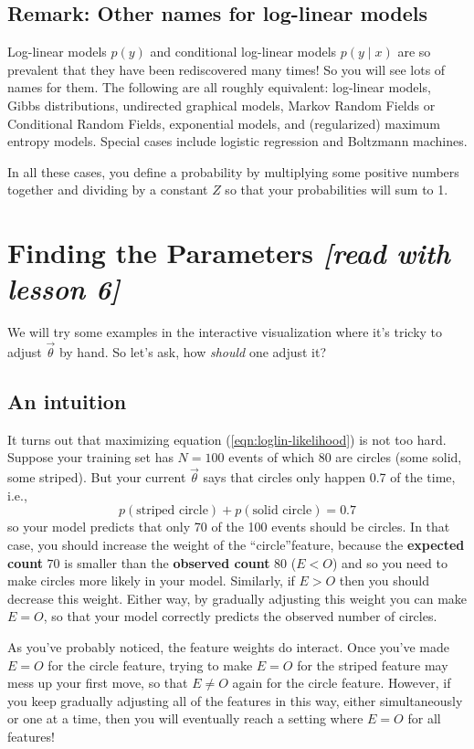 \documentclass[11pt]{article}
\newcommand{\vtheta}{\vec{\theta}}
\begin{document}
\subsection{Remark: Other names for log-linear models}

Log-linear models $p(y)$ and conditional log-linear models
$p(y\mid x)$ are so prevalent that they have been rediscovered many
times!  So you will see lots of names for them.  The following are all
roughly equivalent: log-linear models, Gibbs distributions, undirected
graphical models, Markov Random Fields or Conditional Random Fields,
exponential models, and (regularized) maximum entropy models.
Special cases include logistic regression and Boltzmann machines.

\medskip
In all these cases, you define a probability by multiplying some
positive numbers together and dividing by a constant $Z$ so that your
probabilities will sum to 1.

\section{Finding the Parameters {\em [read with lesson 6]}}

We will try some examples in the interactive visualization where it's
tricky to adjust $\vtheta$ by hand.  So let's ask, how {\em should}
one adjust it?

\subsection{An intuition}

It turns out that maximizing equation (\ref{eqn:loglin-likelihood}) is
not too hard.  Suppose your training set has $N=100$ events of which
80 are circles (some solid, some striped).  But your current $\vtheta$
says that circles only happen 0.7 of the time, i.e.,
$$p(\textrm{striped circle}) + p(\textrm{solid circle}) = 0.7$$
so your model predicts that only 70 of the 100 events should be circles.
%
In that case, you should increase the weight of the ``circle''feature,
because the {\bf expected count} $70$ is smaller than the {\bf
  observed count} $80$ ($E < O$) and so you need to make circles more
likely in your model.  Similarly, if $E > O$ then you should decrease this weight.
Either way, by gradually adjusting this weight you can make $E=O$, so
that your model correctly predicts the observed number of circles.

\medskip
As you've probably noticed, the feature weights do interact.  Once
you've made $E=O$ for the circle feature, trying to make $E=O$ for the
striped feature may mess up your first move, so that $E \neq O$ again
for the circle feature.  However, if you keep gradually adjusting all
of the features in this way, either simultaneously or one at a time,
then you will eventually reach a setting where $E=O$ for all features!
\end{document}
